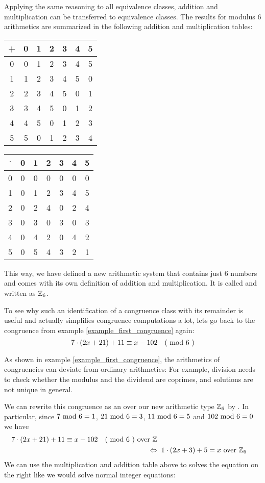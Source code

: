 \begin{example} 
Applying the same reasoning to all equivalence classes, addition and multiplication can  be transferred to  equivalence classes. The results for modulus $6$ arithmetics are summarized in the following addition and multiplication tables:
\begin{center}
  \begin{tabular}{c | c c c c c c}
    + & 0 & 1 & 2 & 3 & 4 & 5\\\hline
    0 & 0 & 1 & 2 & 3 & 4 & 5 \\
    1 & 1 & 2 & 3 & 4 & 5 & 0\\
    2 & 2 & 3 & 4 & 5 & 0 & 1\\
    3 & 3 & 4 & 5 & 0 & 1 & 2\\
    4 & 4 & 5 & 0 & 1 & 2 & 3\\
    5 & 5 & 0 & 1 & 2 & 3 & 4
  \end{tabular} \quad \quad \quad \quad
  \begin{tabular}{c | c c c c c c}
$ \cdot $ & 0 & 1 & 2 & 3 & 4 & 5 \\\hline
        0 & 0 & 0 & 0 & 0 & 0 & 0\\
        1 & 0 & 1 & 2 & 3 & 4 & 5\\
        2 & 0 & 2 & 4 & 0 & 2 & 4\\
        3 & 0 & 3 & 0 & 3 & 0 & 3\\
        4 & 0 & 4 & 2 & 0 & 4 & 2\\
        5 & 0 & 5 & 4 & 3 & 2 & 1
  \end{tabular}
\end{center}
This way, we have defined a new arithmetic system that contains just $6$ numbers and comes with its own definition of addition and multiplication. It is called and written as $\mathbb{Z}_6$.

To see why such an identification of a congruence class with its remainder is useful and actually simplifies congruence computations a lot, lets go back to the congruence from example \ref{example_first_congruence} again:
\begin{equation}
\label{example_congruence_two_1}
7\cdot(2x+21) + 11 \equiv x-102 \quad \text{( mod } 6 \text{ )}
\end{equation}

As shown in example \ref{example_first_congruence}, the arithmetics of congruencies can deviate from ordinary arithmetics: For example, division needs to check whether the modulus and the dividend are coprimes, and solutions are not unique in general.

We can rewrite this congruence as an  over our new arithmetic type $\mathbb{Z}_6$ by . In particular, since $7 \text{ mod } 6= 1$, $21 \text{ mod } 6= 3$, $11 \text{ mod } 6= 5$ and $102 \text{ mod } 6= 0$ we have
\begin{align*}
7\cdot(2x+21) + 11 \equiv x-102 \quad \text{( mod } 6 \text{ )} \text{ over } \mathbb{Z}\\ 
\Leftrightarrow & \; \; 1\cdot (2x+3) + 5 = x \text{ over } \mathbb{Z}_6
\end{align*}
We can use the multiplication and addition table above to solves the equation on the right like we would solve normal integer equations: 


\end{example}
